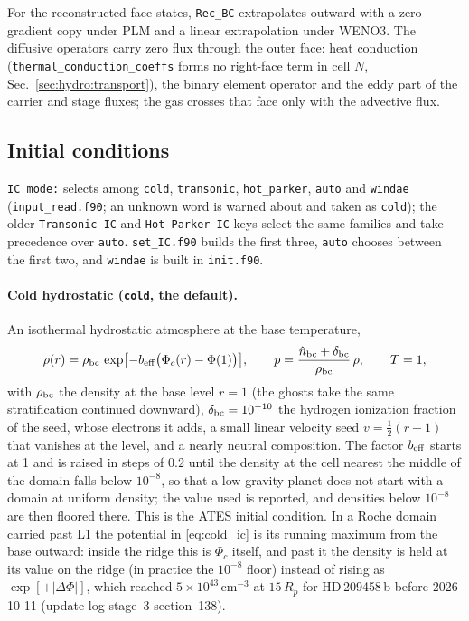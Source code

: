For the reconstructed face states, \texttt{Rec\_BC} extrapolates outward with
a zero-gradient copy under PLM and a linear extrapolation under WENO3.  The
diffusive operators carry zero flux through the outer face: heat conduction
(\texttt{thermal\_conduction\_coeffs} forms no right-face term in cell $N$,
Sec.~\ref{sec:hydro:transport}), the binary element operator and the eddy
part of the carrier and stage fluxes; the gas crosses that face only with the
advective flux.

\subsection{Initial conditions}
\label{sec:bcic:ic}

\texttt{IC mode:} selects among \texttt{cold}, \texttt{transonic},
\texttt{hot\_parker}, \texttt{auto} and \texttt{windae}
(\texttt{input\_read.f90}; an unknown word is warned about and taken as
\texttt{cold}); the older \texttt{Transonic IC} and \texttt{Hot Parker IC}
keys select the same families and take precedence over \texttt{auto}.
\texttt{set\_IC.f90} builds the first three, \texttt{auto} chooses between
the first two, and \texttt{windae} is built in \texttt{init.f90}.

\paragraph{Cold hydrostatic (\texttt{cold}, the default).}
An isothermal hydrostatic atmosphere at the base temperature,
%
\begin{equation}
  \rho(r) = \rho_{\rm bc}\,\exp\bigl[-b_{\rm eff}\bigl(\Phi_c(r) - \Phi(1)\bigr)\bigr],
  \qquad
  p = \frac{\hat n_{\rm bc} + \delta_{\rm bc}}{\rho_{\rm bc}}\,\rho,
  \qquad
  T = 1,
  \label{eq:cold_ic}
\end{equation}
%
with $\rho_{\rm bc}$ the density at the base level $r=1$ (the ghosts take the
same stratification continued downward), $\delta_{\rm bc} = 10^{-10}$ the hydrogen
ionization fraction of the seed, whose electrons it adds, a small linear velocity seed
$v = \tfrac12(r - 1)$ that vanishes at the level, and a nearly neutral
composition.  The factor $b_{\rm eff}$ starts at 1 and is raised in steps of
$0.2$ until the density at the cell nearest the middle of the domain falls
below $10^{-8}$, so that a low-gravity planet does not start with a domain at
uniform density; the value used is reported, and densities below $10^{-8}$
are then floored there.  This is the ATES initial condition.  In a Roche
domain carried past L1 the potential in \eqref{eq:cold_ic} is its running
maximum from the base outward: inside the ridge this is $\Phi_c$ itself, and
past it the density is held at its value on the ridge (in practice the
$10^{-8}$ floor) instead of rising as $\exp[+|\Delta\Phi|]$, which reached
$5\times10^{43}$\,cm$^{-3}$ at $15\,R_p$ for HD\,209458\,b before
2026-10-11 (update log stage~3 section~138).

